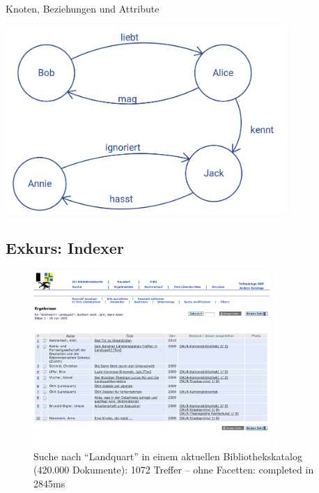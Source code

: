\begin{frame}{Knoten, Beziehungen und Attribute}
  \begin{center}
    \includegraphics[width=0.8\textwidth]{pics/knoten-beziehungen-attribute}
  \end{center}
\end{frame}

\subsection{Exkurs: Indexer}
\begin{frame}{}
  \begin{figure}
    \caption{Suche nach ``Landquart'' in einem aktuellen Bibliothekskatalog (420.000 Dokumente): 1072 Treffer -- ohne Facetten: completed in 2845ms}
    \begin{center}
      \includegraphics[width=0.8\textwidth]{pics/aleph}
    \end{center}
  \end{figure}
\end{frame}

